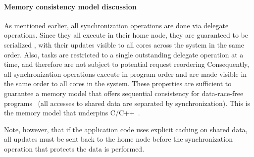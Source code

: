 \paragraph{Memory consistency model discussion} As mentioned earlier, all
synchronization operations are done via delegate operations. Since they all
execute in their home node, they are guaranteed to be serialized , with their
updates visible to all cores across the system in the same order. Also, tasks
are restricted to a single outstanding delegate operation at a time, and
therefore are not subject to potential request reordering  Consequently, all
synchronization operations execute in program order and are made visible in
the same order to all cores in the system. These properties are sufficient to
guarantee a memory model that offers sequential consistency for data-race-free
programs~\cite{AdveHill1990} (all accesses to shared data are separated by
synchronization). This is the memory model that underpins C/C++~\cite{N2480,N2800}.

Note, however, that if the application code uses explicit caching on shared
data, all updates must be sent back to the home node before the
synchronization operation that protects the data is performed.



